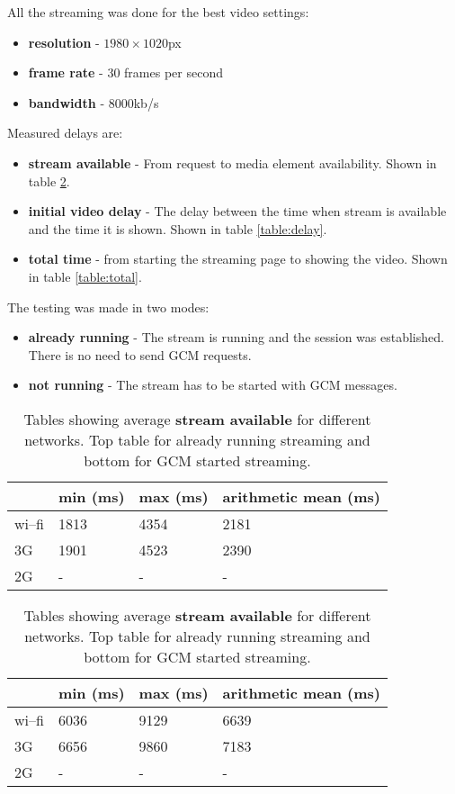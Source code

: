 \noindent
All the streaming was done for the best video settings:\vspace{-0.5em}
\begin{itemize}
	\item \textbf{resolution} - $ 1980\times1020 $px
	\item \textbf{frame rate} - 30 frames per second
	\item \textbf{bandwidth} - 8000kb/s
\end{itemize}

\newpage
\noindent
Measured delays are:\vspace{-0.5em}
\begin{itemize}
	\item \textbf{stream available} - From request to media element availability. Shown in table \ref{table:stream}.
	\item \textbf{initial video delay} - The delay between the time when stream is available and the time it is shown. Shown in table \ref{table:delay}.
	\item  \textbf{total time} - from starting the streaming page to showing the video. Shown in table \ref{table:total}.
\end{itemize}

\noindent
The testing was made in two modes:\vspace{-0.5em}
\begin{itemize}
	\item \textbf{already running} - The stream is running and the session was established. There is no need to send GCM requests.
	\item \textbf{not running} - The stream has to be started with GCM messages.
\end{itemize}

\begin{table}[H]
\caption{Tables showing average \textbf{stream available} for different networks. Top table for already running streaming and bottom for GCM started streaming.}
\begin{center}
\begin{tabular}{|l|l|l|l|}
\hline 
& min (ms) & max (ms) & arithmetic mean (ms) \\
\hline 
wi--fi & 1813 & 4354 & 2181 \\
\hline 
3G & 1901 & 4523 & 2390 \\
\hline 
2G & - & - & - \\
\hline
\end{tabular} 

\label{table:stream}
\vspace{1em}
\begin{tabular}{|l|l|l|l|}
\hline 
& min (ms) & max (ms) & arithmetic mean (ms) \\
\hline 
wi--fi & 6036 & 9129 & 6639 \\
\hline 
3G & 6656 & 9860 & 7183 \\
\hline 
2G & - & - & - \\
\hline
\end{tabular} 
\end{center}
\end{table}

